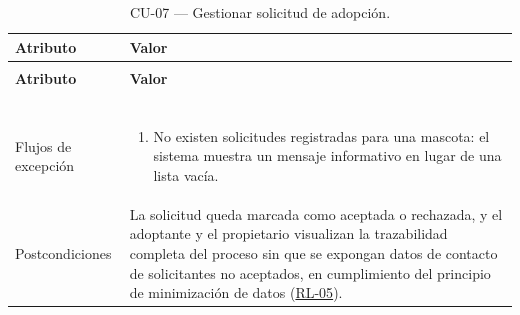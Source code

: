 \documentclass[journal,onecolumn]{IEEEtran}
\makeatletter
\newenvironment{atributos}[2]{%
	\small
	\begin{longtable}{@{}>{\raggedright\arraybackslash}p{4.2cm} >{\raggedright\arraybackslash}p{11.2cm}@{}}
		\caption{#2}\label{tab:#1}\\
		\toprule
		\textbf{Atributo} & \textbf{Valor} \\
		\midrule
		\endfirsthead
		\multicolumn{2}{@{}l}{\small\itshape (continuación)}\\
		\toprule
		\textbf{Atributo} & \textbf{Valor} \\
		\midrule
		\endhead
		\bottomrule
		\endlastfoot
	}{%
	\end{longtable}
	\normalsize
}
\makeatother
\begin{document}
\begin{atributos}{CU-07}{CU-07 --- Gestionar solicitud de adopción.}
\begin{enumerate}[leftmargin=*, nosep]
		\end{enumerate} \\
		Flujos de excepción &
		\begin{enumerate}[leftmargin=*, nosep]
			\item[2.1] No existen solicitudes registradas para una mascota: el sistema muestra un mensaje informativo en lugar de una lista vacía.
		\end{enumerate} \\
		Postcondiciones & La solicitud queda marcada como aceptada o rechazada, y el adoptante y el propietario visualizan la trazabilidad completa del proceso sin que se expongan datos de contacto de solicitantes no aceptados, en cumplimiento del principio de minimización de datos (\hyperref[rl:05]{RL-05}). \\
	\end{atributos}
	
\end{document}
